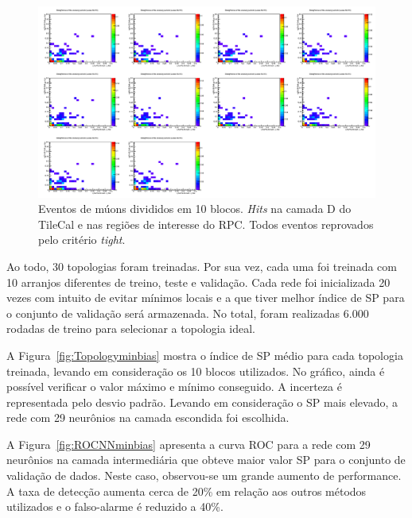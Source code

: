 \begin{figure}
    \centering
    \includegraphics[width=\textheight]{images/minbias/cluster_phi_eta_noclass.png}
    \caption{Eventos de múons divididos em 10 blocos. \emph{Hits} na camada D do
    TileCal e nas regiões de interesse do RPC. Todos eventos reprovados pelo
    critério \emph{tight}.}
    \label{fig:blocominbias-3}
\end{figure}

Ao todo, 30 topologias foram treinadas. Por sua vez, cada uma foi treinada com
10 arranjos diferentes de treino, teste e validação. Cada rede foi inicializada
20 vezes com intuito de evitar mínimos locais e a que tiver melhor índice de SP
para o conjunto de validação será armazenada. No total, foram realizadas 6.000
rodadas de treino para selecionar a topologia ideal.

A Figura~\ref{fig:Topologyminbias} mostra o índice de SP médio para cada
topologia treinada, levando em consideração os 10 blocos utilizados. No gráfico,
ainda é possível verificar o valor máximo e mínimo conseguido. A incerteza é
representada pelo desvio padrão. Levando em consideração o SP mais elevado, a
rede com 29 neurônios na camada escondida foi escolhida.

A Figura~\ref{fig:ROCNNminbias} apresenta a  curva ROC para a rede com 29
neurônios na camada intermediária que obteve maior valor SP para o conjunto de
validação de dados. Neste caso, observou-se um grande aumento de performance. A
taxa de detecção aumenta cerca de 20\% em relação aos outros métodos utilizados
e o falso-alarme é reduzido a 40\%.


